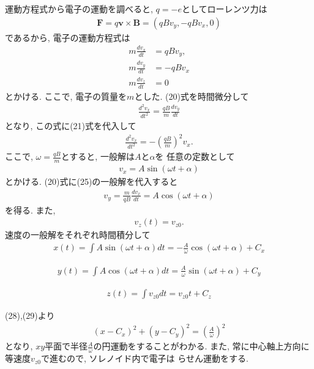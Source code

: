 \documentclass[a4paper,12pt]{jlreq}
\begin{document}
運動方程式から電子の運動を調べると, $q = -e$としてローレンツ力は
\begin{align}
  \bm{F} = q\bm{v} \times \bm{B} = (qBv_y, -qBv_x, 0)
\end{align}
であるから, 電子の運動方程式は
\begin{align}
  m\frac{dv_x}{dt} &= qBv_y,\\
  m\frac{dv_y}{dt} &= -qBv_x\\
  m\frac{dv_z}{dt} &= 0
\end{align}
とかける. ここで, 電子の質量を$m$とした. (20)式を時間微分して
\begin{align}
  \frac{d^2 v_x}{dt^2} = \frac{qB}{m}\frac{dv_y}{dt}
\end{align}
となり, この式に(21)式を代入して
\begin{align}
  \frac{d^2 v_x}{dt^2} = -\left(\frac{qB}{m}\right)^2 v_x.
\end{align}
ここで, $\omega = \frac{qB}{m}$とすると, 一般解は$A$と$\alpha$を
任意の定数として
\begin{align}
  v_x = A\sin (\omega t + \alpha)
\end{align}
とかける. (20)式に(25)の一般解を代入すると
\begin{align}
  v_y = \frac{m}{qB} \frac{dv_x}{dt} = A \cos (\omega t + \alpha)
\end{align}
を得る. また, 
\begin{align}
  v_z (t) = v_{z0}.
\end{align}
速度の一般解をそれぞれ時間積分して
\begin{align}
  x(t) = \int A\sin(\omega t + \alpha)dt = -\frac{A}{\omega} \cos (\omega t + \alpha) + C_x
\end{align}

\begin{align}
  y(t) = \int A\cos (\omega t + \alpha)dt = \frac{A}{\omega} \sin (\omega t + \alpha) + C_y
\end{align}

\begin{align}
  z(t) = \int v_{z0}dt = v_{z0}t + C_z
\end{align}

(28),(29)より
\begin{align}
  (x - C_x)^2 + (y - C_y)^2 = \left(\frac{A}{\omega}\right)^2
\end{align}
となり, $xy$平面で半径$\frac{A}{\omega}$の円運動をすることがわかる. 
また, 常に中心軸上方向に等速度$v_{z0}$で進むので, ソレノイド内で電子は
らせん運動をする. 
\end{document}
